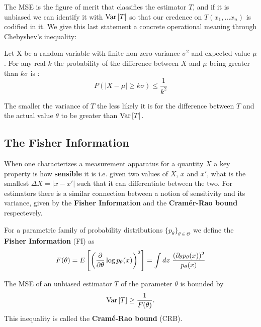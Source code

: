 The MSE is the figure of merit that classifies the estimator $T$, and if it is unbiased we can identify it with $\text{Var}\left[T\right]$ so that
our credence on $T(x_{1}, ... x_{n})$ is codified in it. We give this last statement a concrete operational meaning through
Chebyshev's inequality:

\begin{theorem}
  Let X be a random variable with finite non-zero variance $\sigma^{2}$ and expected value $\mu$. For any real $k$ the probability of the
  difference between $X$ and $\mu$ being greater than $k\sigma$ is \cite{feller1971introduction}:
$$
P(|X-\mu|\geq k\sigma)\leq \frac{1}{k^{2}}
$$
\end{theorem}

The smaller the variance of $T$ the less likely it is for the difference between $T$ and the actual value $\theta$ to be greater than
$\text{Var}\left[T\right]$.

\subsection{The Fisher Information}
When one characterizes a measurement apparatus for a quantity $X$ a key property is how \textbf{sensible} it is i.e. given two values  of $X$,
$x$ and $x'$, what is the smallest $\Delta X = |x-x'|$ such that it can differentiate between the two. For estimators there is a similar
connection between a notion of sensitivity and its variance, given by the \textbf{Fisher Information} and the \textbf{Cram\'er-Rao bound}
respectevely.

\begin{definition}
  For a parametric family of probability distributions $\{p_{\theta}\}_{\theta \in \Theta}$ we define the \textbf{Fisher Information} (FI)
  as
  \begin{equation}
    F(\theta) = E\left[\left(\frac{\partial}{\partial \theta}\log{p_{\theta}(x)} \right)^{2}\right] = \int dx \hspace{0.1cm} \frac{(\partial_{\theta} p_{\theta}(x))^{2}}{p_{\theta}(x)}
  \end{equation}
\end{definition}


\begin{theorem}
  The MSE of an unbiased estimator $T$ of the parameter $\theta$ is bounded by
  \begin{equation}
    \text{Var}\left[T\right]\geq \frac{1}{F(\theta)}.
  \end{equation}
  This inequality is called the \textbf{Cram\'e-Rao bound} (CRB).
\end{theorem}

